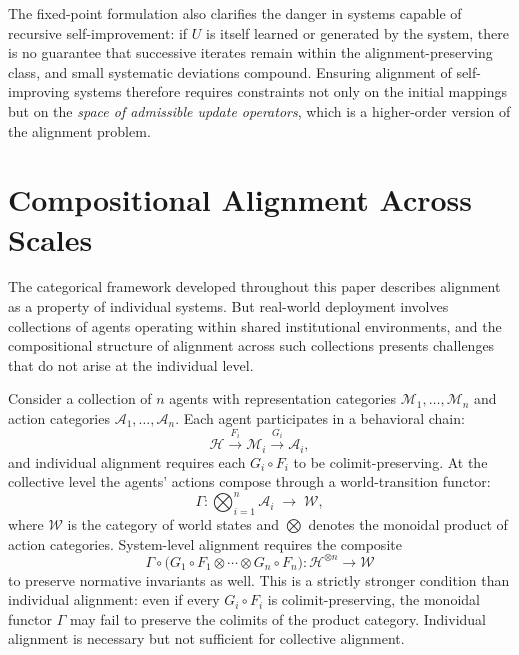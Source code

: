 \documentclass[12pt]{article}
\theoremstyle{definition}
\begin{document}
The fixed-point formulation also clarifies the danger in systems capable of
recursive self-improvement: if $U$ is itself learned or generated by the
system, there is no guarantee that successive iterates remain within the
alignment-preserving class, and small systematic deviations compound. Ensuring
alignment of self-improving systems therefore requires constraints not only on
the initial mappings but on the \emph{space of admissible update operators},
which is a higher-order version of the alignment problem.

\section{Compositional Alignment Across Scales}

The categorical framework developed throughout this paper describes alignment
as a property of individual systems. But real-world deployment involves
collections of agents operating within shared institutional environments, and
the compositional structure of alignment across such collections presents
challenges that do not arise at the individual level.

Consider a collection of $n$ agents with representation categories
$\mathcal{M}_1, \ldots, \mathcal{M}_n$ and action categories $\mathcal{A}_1,
\ldots, \mathcal{A}_n$. Each agent participates in a behavioral chain:
\begin{equation}
  \mathcal{H}
  \xrightarrow{F_i}
  \mathcal{M}_i
  \xrightarrow{G_i}
  \mathcal{A}_i,
\end{equation}
and individual alignment requires each $G_i \circ F_i$ to be colimit-preserving.
At the collective level the agents' actions compose through a world-transition
functor:
\begin{equation}
  \Gamma : \bigotimes_{i=1}^{n} \mathcal{A}_i \;\to\; \mathcal{W},
\end{equation}
where $\mathcal{W}$ is the category of world states and $\bigotimes$ denotes
the monoidal product of action categories. System-level alignment requires the
composite
\begin{equation}
  \Gamma \circ \bigl(G_1 \circ F_1 \otimes \cdots \otimes G_n \circ F_n\bigr)
  : \mathcal{H}^{\otimes n} \to \mathcal{W}
\end{equation}
to preserve normative invariants as well. This is a strictly stronger condition
than individual alignment: even if every $G_i \circ F_i$ is colimit-preserving,
the monoidal functor $\Gamma$ may fail to preserve the colimits of the product
category. Individual alignment is necessary but not sufficient for collective
alignment.
\end{document}
